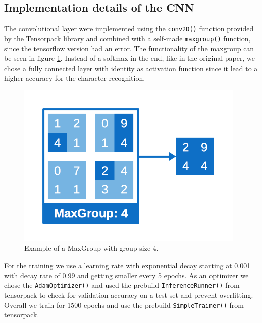 \documentclass{utue} %
\begin{document}
\subsection{Implementation details of the CNN}
The convolutional layer were implemented using the \texttt{conv2D()} function provided by the Tensorpack library and combined with a self-made \texttt{maxgroup()} function, since the tensorflow version had an error. The functionality of the maxgroup can be seen in figure \ref{fig:impl_maxgroup}. Instead of a softmax in the end, like in the original paper, we chose a fully connected layer with identity as activation function since it lead to a higher accuracy for the character recognition. \\
\begin{figure}[h!]
	\centering
	\includegraphics[width=.9\columnwidth]{graphics/impl_maxgroups.png}
	\caption{\label{fig:impl_maxgroup} Example of a MaxGroup with group size 4.}
\end{figure}

For the training we use a learning rate with exponential decay starting at 0.001 with decay rate of 0.99 and getting smaller every 5 epochs. As an optimizer we chose the \texttt{AdamOptimizer()} and used the prebuild \texttt{InferenceRunner()} from tensorpack to check for validation accuracy on a test set and prevent overfitting. Overall we train for 1500 epochs and use the prebuild \texttt{SimpleTrainer()} from tensorpack. 
\end{document}

